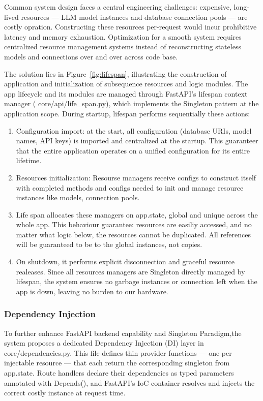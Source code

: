 Common system design faces a central engineering challenges: expensive, long-lived resources — LLM model instances and database connection pools — are costly opration. 
Constructing these resources per-request would incur prohibitive latency and memory exhaustion. 
Optimization for a smooth system requires centralized resource management systems instead of reconstructing stateless models and connections over and over across code base.

The solution lies in Figure~\ref{fig:lifespan}, illustrating the construction of application and initialization of subsequence resources and logic modules. 
The app lifecycle and its modules are managed through FastAPI's  {lifespan} context manager ( {core/api/life\_span.py}), which implements 
the  {Singleton} pattern at 
the application scope. During startup,  {lifespan} performs sequentially these actions:
\begin{enumerate}
  \item Configuration import: at the start, all configuration (database URIs, model names, API keys) is imported and centralized at the startup. This guaranteer
  that the entire application operates on a unified configuration for its entire lifetime. 
  \item Resources initialization: Resourse managers receive configs to 
  construct itself with completed methods and configs needed to init and manage resource instances like models, connection pools. 
  \item Life span allocates these managers on app.state, global and unique across the whole app. This behaviour guarantee: resources are easiliy accessed, and no matter 
  what logic below, the resources cannot be duplicated. All references will be guaranteed to be to the global instances, not copies. 
 \item On shutdown, it performs explicit disconnection and graceful resource realeases. Since all resources managers are Singleton directly managed by lifespan, the system
ensures no garbage instances or connection left when the app is down, leaving no burden to our hardware.
\end{enumerate}

 \subsubsection{Dependency Injection}
To further enhance FastAPI backend capability and Singleton Paradigm,the system proposes a dedicated  {Dependency Injection} (DI) layer in 
 {core/dependencies.py}. 
This file defines thin  {provider functions} — one per injectable resource — that each return the corresponding singleton from  {app.state}. 
Route handlers declare their dependencies as typed parameters annotated with  {Depends()}, and FastAPI's IoC container resolves and injects the correct 
costly instance at request time.

